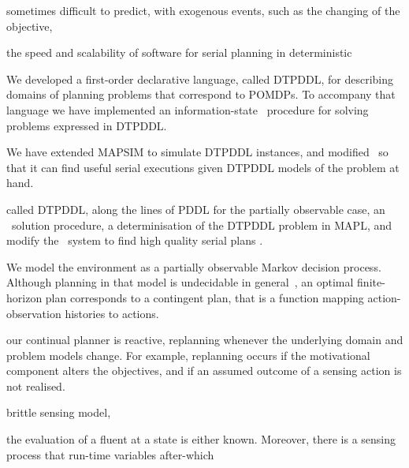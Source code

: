 \documentclass[letterpaper]{article}
\begin{document}
sometimes difficult to predict, with exogenous events, such as the
changing of the objective, 





the speed and scalability of software for serial planning in
deterministic




We developed a first-order declarative language, called DTPDDL, for
describing domains of planning problems that correspond to POMDPs.  To
accompany that language we have implemented an information-state
\laostar\ procedure for solving problems expressed in DTPDDL. 

We have extended MAPSIM to simulate DTPDDL instances, and modified
\fastdownward\ so that it can find useful serial executions given
DTPDDL models of the problem at hand.




 called DTPDDL, along
the lines of PDDL for the partially observable case, an \laostar\
solution procedure, a determinisation of the DTPDDL problem in MAPL,
and modify the \fastdownward\ system to find high quality serial plans
.

We model the environment as a partially observable Markov decision
process. Although planning in that model is undecidable in
general~\cite{}, an optimal finite-horizon plan corresponds to a
contingent plan, that is a function mapping action-observation
histories to actions.

our continual planner is reactive, replanning whenever the underlying
domain and problem models change. For example, replanning occurs if
the motivational component alters the objectives, and if an assumed
outcome of a sensing action is not realised.

brittle sensing model, 

the evaluation of a fluent at a state is either known. Moreover, there
is a sensing process that run-time variables  after-which 


\end{document}
